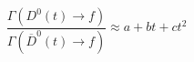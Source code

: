 \documentclass[preview, convert={density=300,size=1080x800,outext=.png}]{standalone}
\begin{document}
\begin{equation*}
    \frac{\Gamma(D^0(t) \rightarrow f)}{\Gamma (\overline{D}^0(t) \rightarrow f)}
    \approx  a + bt + ct^2
\end{equation*}
\end{document}
